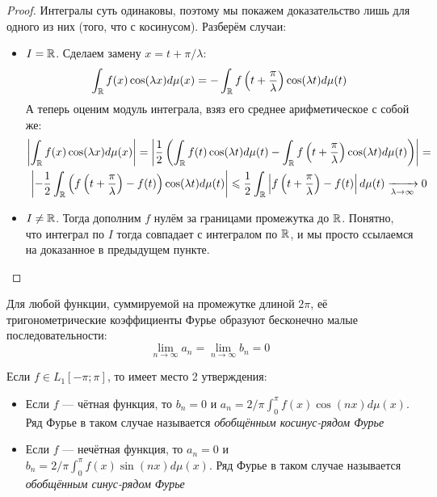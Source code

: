 \begin{proof}
	Интегралы суть одинаковы, поэтому мы покажем доказательство лишь для одного из них (того, что с косинусом). Разберём случаи:
	\begin{itemize}
		\item $I = \mathbb{R}$. Сделаем замену $x = t + \pi / \lambda$:
		\[
			\int_{\mathbb{R}} f(x)\cos(\lambda x)d\mu(x) = -\int_{\mathbb{R}} f\left(t + \frac{\pi}{\lambda}\right)\cos(\lambda t)d\mu(t)
		\]
		А теперь оценим модуль интеграла, взяз его среднее арифметическое с собой же:
		\begin{multline*}
			\left|\int_{\mathbb{R}} f(x)\cos(\lambda x)d\mu(x)\right| = \left|\frac{1}{2}\left(\int_{\mathbb{R}} f(t)\cos(\lambda t)d\mu(t) - \int_{\mathbb{R}} f\left(t + \frac{\pi}{\lambda}\right)\cos(\lambda t)d\mu(t)\right)\right| = \\
			\left|-\frac{1}{2}\int_{\mathbb{R}} \left(f\left(t + \frac{\pi}{\lambda}\right) - f(t)\right)\cos(\lambda t)d\mu(t)\right| \leqslant \frac{1}{2}\int_{\mathbb{R}} \left|f\left(t + \frac{\pi}{\lambda}\right) - f(t)\right|d\mu(t) \xrightarrow[\lambda \to \infty]{} 0
		\end{multline*}
		
		\item $I \neq \mathbb{R}$. Тогда дополним $f$ нулём за границами промежутка до $\mathbb{R}$. Понятно, что интеграл по $I$ тогда совпадает с интегралом по $\mathbb{R}$, и мы просто ссылаемся на доказанное в предыдущем пункте.
	\end{itemize}
\end{proof}

\begin{corollary}
	Для любой функции, суммируемой на промежутке длиной $2\pi$, её тригонометрические коэффициенты Фурье образуют бесконечно малые последовательности:
	\[
		\lim_{n \to \infty} a_n = \lim_{n \to \infty} b_n = 0
	\]
\end{corollary}

\begin{proposition}
	Если $f \in L_1[-\pi; \pi]$, то имеет место 2 утверждения:
	\begin{itemize}
		\item Если $f$ --- чётная функция, то $b_n = 0$ и $a_n = 2/\pi \int_0^\pi f(x) \cos(nx) d\mu(x)$. Ряд Фурье в таком случае называется \textit{обобщённым косинус-рядом Фурье}
		
		\item Если $f$ --- нечётная функция, то $a_n = 0$  и $b_n = 2/\pi \int_0^\pi f(x) \sin(nx) d\mu(x)$. Ряд Фурье в таком случае называется \textit{обобщённым синус-рядом Фурье}
	\end{itemize}
\end{proposition}

